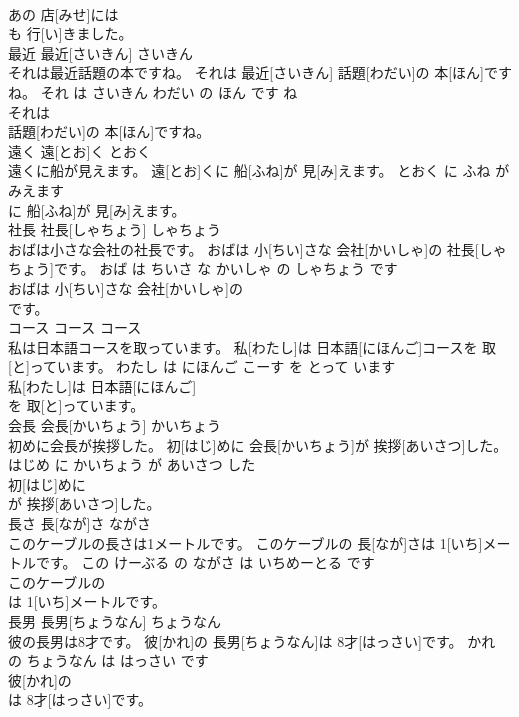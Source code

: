 \documentclass[8pt]{extreport}
\begin{document}
\begin{CJK}{UTF8}{min}
\\	あの 店[みせ]には
\\	も 行[い]きました。			
\\	最近	最近[さいきん]	さいきん	
\\	それは最近話題の本ですね。	それは 最近[さいきん] 話題[わだい]の 本[ほん]ですね。	それ は さいきん わだい の ほん です ね	
\\	それは
\\	話題[わだい]の 本[ほん]ですね。			
\\	遠く	遠[とお]く	とおく	
\\	遠くに船が見えます。	遠[とお]くに 船[ふね]が 見[み]えます。	とおく に ふね が みえます	
\\	に 船[ふね]が 見[み]えます。			
\\	社長	社長[しゃちょう]	しゃちょう	
\\	おばは小さな会社の社長です。	おばは 小[ちい]さな 会社[かいしゃ]の 社長[しゃちょう]です。	おば は ちいさ な かいしゃ の しゃちょう です	
\\	おばは 小[ちい]さな 会社[かいしゃ]の
\\	です。			
\\	コース	コース	コース	
\\	私は日本語コースを取っています。	私[わたし]は 日本語[にほんご]コースを 取[と]っています。	わたし は にほんご こーす を とって います	
\\	私[わたし]は 日本語[にほんご]
\\	を 取[と]っています。			
\\	会長	会長[かいちょう]	かいちょう	
\\	初めに会長が挨拶した。	初[はじ]めに 会長[かいちょう]が 挨拶[あいさつ]した。	はじめ に かいちょう が あいさつ した	
\\	初[はじ]めに
\\	が 挨拶[あいさつ]した。			
\\	長さ	長[なが]さ	ながさ	
\\	このケーブルの長さは1メートルです。	このケーブルの 長[なが]さは 1[いち]メートルです。	この けーぶる の ながさ は いちめーとる です	
\\	このケーブルの
\\	は 1[いち]メートルです。			
\\	長男	長男[ちょうなん]	ちょうなん	
\\	彼の長男は8才です。	彼[かれ]の 長男[ちょうなん]は 8才[はっさい]です。	かれ の ちょうなん は はっさい です	
\\	彼[かれ]の
\\	は 8才[はっさい]です。			

\end{CJK}
\end{document}
